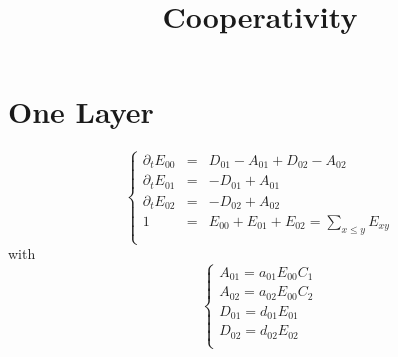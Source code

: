 \documentclass[aps,onecolumn,12pt]{revtex4}
\begin{document}
\title{Cooperativity}
\maketitle

\section{One Layer}

\begin{equation}
\left\lbrace
\begin{array}{rcl}
\partial_t E_{00} & = & D_{01}-A_{01} + D_{02}-A_{02}\\
\partial_t E_{01} & = & -D_{01}+A_{01}\\
\partial_t E_{02} & = & -D_{02}+A_{02}\\
1                 & = & E_{00}+E_{01}+E_{02} = \sum_{x\leq y} E_{xy}\\
\end{array}
\right.
\end{equation}
with
\begin{equation}
\left\lbrace
\begin{array}{rcl}
A_{01} = a_{01} E_{00} C_1\\
A_{02} = a_{02} E_{00} C_2\\
D_{01} = d_{01} E_{01}\\
D_{02} = d_{02} E_{02}\\
\end{array}
\right.
\end{equation}
\end{document}
